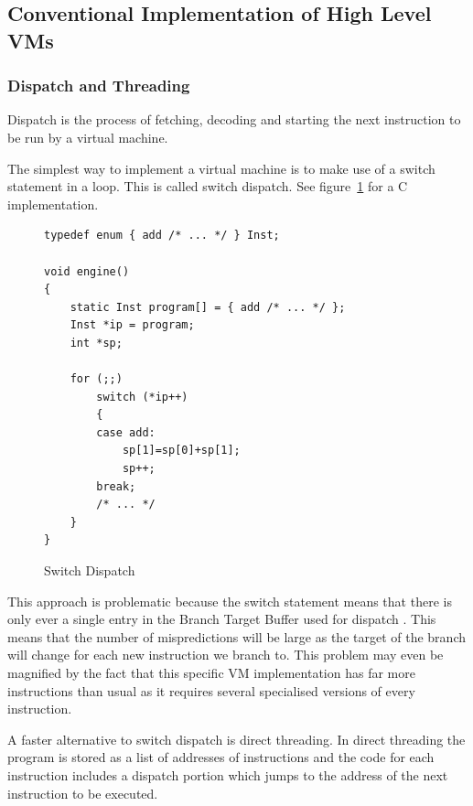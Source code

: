 \documentclass[english,a4paper]{article}
\begin{document}
\subsection{Conventional Implementation of High Level VMs}

\subsubsection{Dispatch and Threading}

Dispatch is the process of fetching, decoding and starting the next
instruction to be run by a virtual machine.

The simplest way to implement a virtual machine is to make use of a
switch statement in a loop. This is called switch dispatch. See
figure~\ref{fig:switch} for a C implementation.

\begin{figure}
  \begin{lstlisting}
typedef enum { add /* ... */ } Inst; 

void engine() 
{ 
    static Inst program[] = { add /* ... */ }; 
    Inst *ip = program; 
    int *sp; 

    for (;;) 
        switch (*ip++) 
        { 
        case add: 
            sp[1]=sp[0]+sp[1]; 
            sp++; 
        break; 
        /* ... */ 
    }
} 
  \end{lstlisting}
  \caption{Switch Dispatch}
  \label{fig:switch}
\end{figure}

This approach is problematic because the switch statement means that
there is only ever a single entry in the Branch Target Buffer used for
dispatch . This means that the number of mispredictions will be large
as the target of the branch will change for each new instruction we
branch to. This problem may even be magnified by the fact that this
specific VM implementation has far more instructions than usual as it
requires several specialised versions of every instruction.

A faster alternative to switch dispatch is direct
threading\cite{Ertl}. In direct threading the program is stored as a
list of addresses of instructions and the code for each instruction
includes a dispatch portion which jumps to the address of the next
instruction to be executed.
\end{document}
